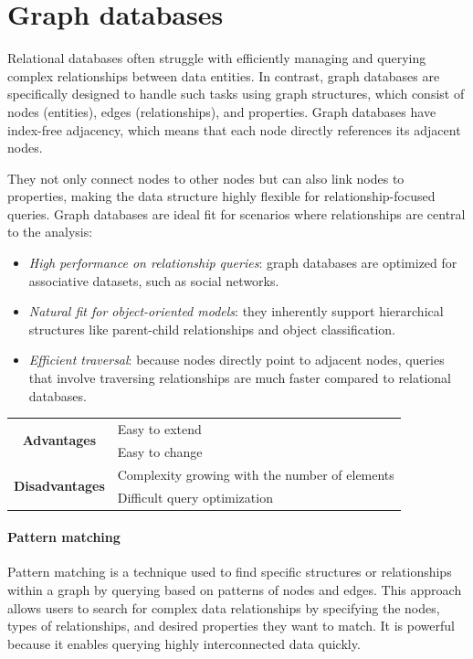 \section{Graph databases}

Relational databases often struggle with efficiently managing and querying complex relationships between data entities. 
In contrast, graph databases are specifically designed to handle such tasks using graph structures, which consist of nodes (entities), edges (relationships), and properties.
Graph databases have index-free adjacency, which means that each node directly references its adjacent nodes. 

They not only connect nodes to other nodes but can also link nodes to properties, making the data structure highly flexible for relationship-focused queries.
Graph databases are ideal fit for scenarios where relationships are central to the analysis:
\begin{itemize}
    \item \textit{High performance on relationship queries}: graph databases are optimized for associative datasets, such as social networks.
    \item \textit{Natural fit for object-oriented models}: they inherently support hierarchical structures like parent-child relationships and object classification.
    \item \textit{Efficient traversal}: because nodes directly point to adjacent nodes, queries that involve traversing relationships are much faster compared to relational databases.
\end{itemize}
\renewcommand*{\arraystretch}{2}
\begin{table}[H]
    \centering
    \begin{tabular}{|c|l|}
    \hline
    \multirow{2}{*}{\textbf{Advantages}}    & Easy to extend                                 \\
                                            & Easy to change                                 \\ \hline
    \multirow{2}{*}{\textbf{Disadvantages}} & Complexity growing with the number of elements \\
                                            & Difficult query optimization                   \\ \hline
    \end{tabular}
\end{table}
\renewcommand*{\arraystretch}{2}

\paragraph*{Pattern matching}
Pattern matching is a technique used to find specific structures or relationships within a graph by querying based on patterns of nodes and edges.
This approach allows users to search for complex data relationships by specifying the nodes, types of relationships, and desired properties they want to match.
It is powerful because it enables querying highly interconnected data quickly. 

